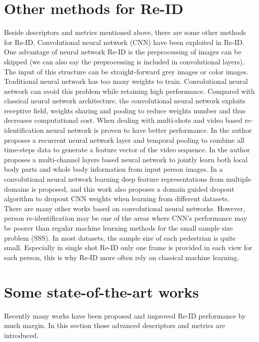 \section{Other methods for Re-ID}
Beside descriptors and metrics mentioned above, there are some other methods for Re-ID. Convolutional neural network (CNN) have been exploited in Re-ID. One advantage of neural network Re-ID is the preprocessing of images can be skipped (we can also say the preprocessing is included in convolutional layers). The input of this structure can be straight-forward grey images or color images.  Traditional neural network has too many weights to train. Convolutional neural network can avoid this problem while retaining high performance. Compared with classical neural network architecture, the convolutional neural network exploits receptive field, weights sharing and pooling to reduce weights number and thus decreases computational cost. When dealing with multi-shots and video based re-identification neural network is proven to have better performance. In \cite{RecurrentCNN} the author proposes a recurrent neural network layer and temporal pooling to combine all time-steps data to generate a feature vector of the video sequence. In \cite{MultiCNN} the author proposes a multi-channel layers based neural network to jointly learn both local body parts and whole body information from input person images.  In \cite{DeepfeatureCNN} a convolutional neural network learning deep feature representations from multiple domains is proposed, and this work also proposes a domain guided dropout algorithm to dropout CNN weights when learning from different datasets. \\
\indent There are many other works based on convolutional neural networks. However, person re-identification may be one of the areas where CNN's performance may be poorer than regular machine learning methods for the small sample size problem (SSS). In most datasets, the sample size of each pedestrian is quite small. Especially in single shot Re-ID only one frame is provided in each view for each person, this is why Re-ID more often rely on classical machine learning.

%

\section{Some state-of-the-art works}
Recently many works have been proposed and improved Re-ID performance by much margin. In this section those advanced descriptors and metrics are introduced. 

